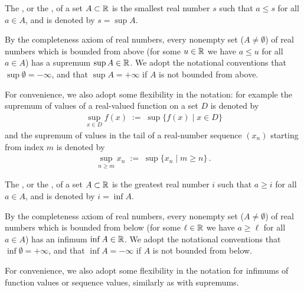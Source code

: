\begin{definition}[Supremum]
  \label{def:supremum}
  The , or the , of a set $A \subset \mathbb{R}$
  is the smallest real number $s$ such that $a \le s$ for all $a \in A$,
  and is denoted by $s = \sup A$.

  By the completeness axiom of real numbers,
  every nonempty set ($A \ne \emptyset$) of real numbers which is bounded
  from above (for some $u \in \mathbb{R}$ we have $a \le u$ for all $a \in A$)
  has a supremum $\sup A \in \mathbb{R}$. We adopt the notational conventions
  that $\sup \emptyset = -\infty$, and that $\sup A = +\infty$ if $A$ is not
  bounded from above.

  For convenience, we also adopt some flexibility in the
  notation:
  for example the supremum of values of a real-valued
  function on a set $D$ is denoted by
  \begin{align*}
    \sup_{x \in D} f(x) \; := \; \sup \big\{ f(x) \; \big| \; x \in D \big\}
  \end{align*}
  and the supremum of values in the tail of a real-number
  sequence $(x_n)$ starting from index $m$ is denoted by
  \begin{align*}
    \sup_{n \ge m} x_n \; := \; \sup \big\{ x_n \; \big| \; m \ge n \big\} \, .
  \end{align*}
\end{definition}

\begin{definition}[Infimum]
  \label{def:infimum}
  The , or the , of a set $A \subset \mathbb{R}$
  is the greatest real number $i$ such that $a \ge i$ for all $a \in A$,
  and is denoted by $i = \inf A$.

  By the completeness axiom of real numbers,
  every nonempty set ($A \ne \emptyset$) of real numbers which is bounded
  from below (for some $\ell \in \mathbb{R}$ we have $a \ge \ell$ for all $a \in A$)
  has an infimum $\inf A \in \mathbb{R}$. We adopt the notational conventions
  that $\inf \emptyset = +\infty$, and that $\inf A = -\infty$ if $A$ is not
  bounded from below.

  For convenience, we also adopt some flexibility in the
  notation for infimums of function values or sequence
  values, similarly as with supremums.
\end{definition}


